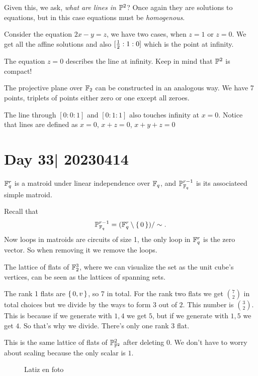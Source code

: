 \documentclass[12pt]{memoir}
\begin{document}
Given this, we ask, \emph{what are lines in $\mathbb{P}^2$}? Once again they are solutions to equations, but in this case equations must be \emph{homogenous}.

\begin{Ex}
    Consider the equation $2x-y=z$, we have two cases, when $z=1$ or $z=0$. We get all the affine solutions and also $[\half:1:0]$ which is the point at infinity.\par 
    The equation $z=0$ describes the line at infinity. Keep in mind that $\mathbb{P}^2$ is compact!
\end{Ex}

\begin{Ex}
    The projective plane over $\mathbb{F}_2$ can be constructed in an analogous way. We have 7 points, triplets of points either zero or one except all zeroes.\par 
    The line through $[0:0:1]$ and $[0:1:1]$ also touches infinity at $x=0$. 
    Notice that lines are defined as $x=0$, $x+z=0$, $x+y+z=0$
    
\end{Ex}

\section{Day 33| 20230414}

\begin{Lem}
$\mathbb{F}_q^r$ is a matroid under linear independence over $\mathbb{F}_q$, and $\mathbb{P}_{\mathbb{F}_q}^{r-1}$ is its associateed simple matroid. 
\end{Lem}

\begin{ptcbp}
Recall that 
$$\mathbb{P}_{\mathbb{F}_q}^{r-1}=(\mathbb{F}_q^r\setminus\{\,0\,\})/\sim.$$
Now loops in matroids are circuits of size 1, the only loop in $\mathbb{F}_q^r$ is the zero vector. So when removing it we remove the loops.
\end{ptcbp}

\begin{Ex}
    The lattice of flats of $\mathbb{F}_2^3$, where we can visualize the set as the unit cube's vertices, can be seen as the lattices of spanning sets.\par 
    The rank 1 flats are $\{\,0,v\,\}$, so 7 in total. For the rank two flats we get $\binom{7}{2}$ in total choices but we divide by the ways to form $3$ out of $2$. This number is $\binom{3}{2}$. This is because if we generate with $1,4$ we get $5$, but if we generate with $1,5$ we get $4$. So that's why we divide. There's only one rank 3 flat.\par 
    This is the same lattice of flats of $\mathbb{P}_{\mathbb{F}^2}^2$ after deleting $0$. We don't have to worry about scaling because the only scalar is $1$.
    \begin{figure}
        Latiz en foto
    \end{figure}
\end{Ex}
\end{document}
